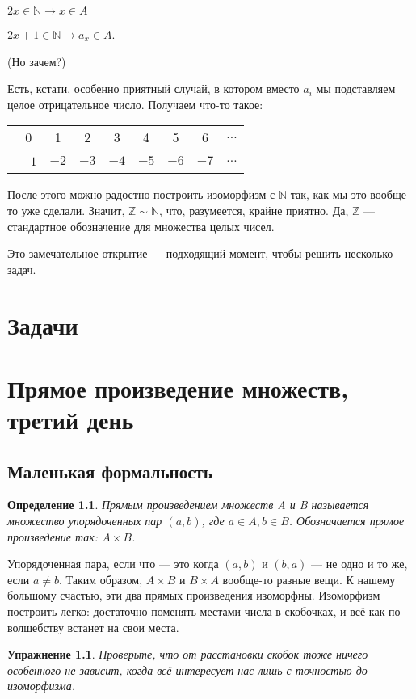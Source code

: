 \documentclass[12pt, onecolumn]{report}
\newtheorem{definition}{Определение}
\newtheorem*{exe}{Упражнение}
\begin{document}
$2x \in \mathbb N \rightarrow x \in A$

$2x+1 \in \mathbb N \rightarrow a_x \in A$.

(Но зачем?)

Есть, кстати, особенно приятный случай, в котором вместо $a_i$ мы подставляем целое отрицательное число. Получаем что-то такое:

\begin{flushleft}
\begin{tabular}{cccccccc}
\ 0 & 1 & 2 & 3 & 4 & 5 & 6 & $\ldots$ \\
\ $-1$ & $-2$ & $-3$ & $-4$ & $-5$ & $-6$ & $-7$ & $\ldots$ \\
\end{tabular}
\end{flushleft}
После этого можно радостно построить изоморфизм с $\mathbb N$ так, как мы это вообще-то уже сделали. Значит, $\mathbb Z \sim \mathbb N$, что, разумеется, крайне приятно. Да, $\mathbb Z$ --- стандартное обозначение для множества целых чисел.

Это замечательное открытие --- подходящий момент, чтобы решить несколько задач.

\chapter*{Задачи}
\chapter{Прямое произведение множеств, третий день}
\section{Маленькая формальность}
\begin{definition}
Прямым произведением множеств A и B называется множество упорядоченных пар $(a, b)$, где $a \in A, b \in B$. Обозначается прямое произведение так: $A \times B$.
\end{definition}
Упорядоченная пара, если что --- это когда $(a, b)$ и $(b, a)$ --- не одно и то же, если $a \neq b$. Таким образом, $A \times B$ и $B \times A$ вообще-то разные вещи. К нашему большому счастью, эти два прямых произведения изоморфны. Изоморфизм построить легко: достаточно поменять местами числа в скобочках, и всё как по волшебству встанет на свои места.
\begin{exe}
Проверьте, что от расстановки скобок тоже ничего особенного не зависит, когда всё интересует нас лишь с точностью до изоморфизма.
\end{exe}
\end{document}
